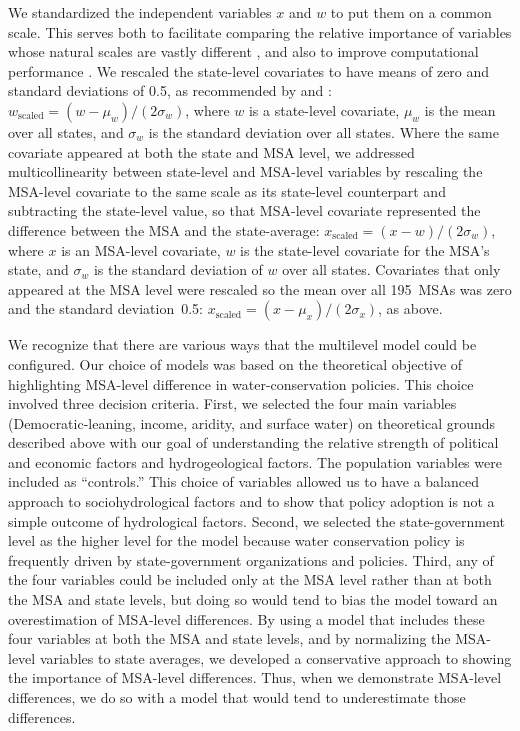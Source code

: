 \documentclass[draft,linenumbers]{agujournal}
\begin{document}
We standardized the independent variables $x$ and $w$ to put them on a common
scale. This serves both
to facilitate comparing the relative importance of variables whose natural scales are
vastly different
\citep[pp.~55--57]{gelman:prior:2008,gelman:arm:2007},
and also to improve computational performance \citep{stan:manual:2015}.
We rescaled the state-level covariates to have means of zero and
standard deviations of 0.5, as recommended by \citet{gelman:prior:2008}
and \citet[pp.~55--57]{gelman:arm:2007}:
$w_{\text{scaled}} = (w - \mu_w) / (2 \sigma_w)$,
where $w$ is a state-level covariate,
$\mu_w$ is the mean over all states,
and $\sigma_w$ is the standard deviation over all states.
Where the same covariate appeared at both the state and
MSA level,
we addressed multicollinearity between state-level and MSA-level
variables by rescaling the MSA-level covariate
to the same scale as its state-level counterpart and
subtracting the state-level value,
so that MSA-level covariate represented the difference between the MSA and
the state-average:
$x_{\text{scaled}} = (x - w) / (2 \sigma_w)$, where $x$ is an MSA-level
covariate, $w$ is the state-level covariate for the MSA's state, and $\sigma_w$
is the standard deviation of $w$ over all states.
Covariates that only appeared at the MSA level were rescaled so
the mean over all 195~MSAs was zero and the standard deviation~0.5:
$x_{\text{scaled}} = (x - \mu_x) / (2 \sigma_x)$, as above.

We recognize that there are various ways that the multilevel model could be
configured.
Our choice of models was based on the theoretical objective of highlighting MSA-level
difference in water-conservation policies. This choice involved three decision criteria.
First, we selected the four main variables (Democratic-leaning, income, aridity, and
surface water) on theoretical grounds described above with our goal of understanding the
relative strength of political and economic factors and hydrogeological factors. The
population variables were included as ``controls.'' This choice of variables allowed us to
have a balanced approach to sociohydrological factors and to show that policy adoption is
not a simple outcome of hydrological factors. Second, we selected the state-government
level as the higher level for the model because water conservation policy is frequently
driven by state-government organizations and policies. Third, any of the four variables
could be included only at the MSA level rather than at both the MSA and state levels, but
doing so would tend to bias the model toward an overestimation of MSA-level differences.
By using a model that includes these four variables at both the MSA and state levels, and
by normalizing the MSA-level variables to state averages, we developed a conservative
approach to showing the importance of MSA-level differences.
Thus, when we demonstrate MSA-level differences, we do so with a model that would tend
to underestimate those differences.
\end{document}
